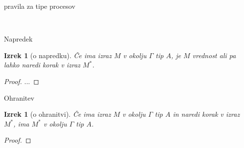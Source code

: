 \documentclass{beamer}
\theoremstyle{definition} %
\theoremstyle{plain} %
\newtheorem{izrek}[definicija]{Izrek}
\begin{document}
	\begin{frame}{pravila za tipe procesov}
		\begin{figure}[tp]
			\centering
			\small
			\begin{mathpar}
				\quad
				\\
				\quad
			\end{mathpar}
		\end{figure}
	\end{frame}

	
	\begin{frame}{Napredek}
		
		\begin{izrek}[o napredku]
			Če ima izraz $M$ v okolju $\Gamma$ tip $A$, je $M$ vrednost ali pa lahko naredi korak v izraz $M^*$.
		\end{izrek}
		
		\begin{proof}
			... 
		\end{proof}
		
	\end{frame}

	
		
	\begin{frame}{Ohranitev}
				
		\begin{izrek}[o ohranitvi]
			Če ima izraz $M$ v okolju $\Gamma$ tip $A$ in naredi korak v izraz $M^*$, ima $M^*$ v okolju $\Gamma$ tip $A$.
		\end{izrek}
		
		\begin{proof}
		\end{proof}
		
	\end{frame}
\end{document}
